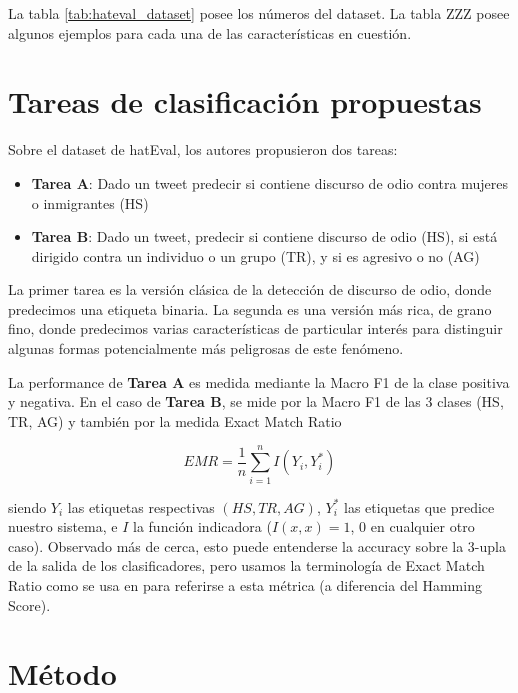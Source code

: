 La tabla \ref{tab:hateval_dataset} posee los números del dataset. La tabla ZZZ posee algunos ejemplos para cada una de las características en cuestión.

\section{Tareas de clasificación propuestas}

Sobre el dataset de hatEval, los autores propusieron dos tareas:

\newcommand{\subtaska}[0]{\textbf{Tarea A}}
\newcommand{\subtaskb}[0]{\textbf{Tarea B}}

\begin{itemize}
    \item \subtaska{}: Dado un tweet predecir si contiene discurso de odio contra mujeres o inmigrantes (HS)
    \item \subtaskb{}: Dado un tweet, predecir si contiene discurso de odio (HS), si está dirigido contra un individuo o un grupo (TR), y si es agresivo o no (AG)
\end{itemize}


La primer tarea es la versión clásica de la detección de discurso de odio, donde predecimos una etiqueta binaria. La segunda es una versión más rica, de grano fino, donde predecimos varias características de particular interés para distinguir algunas formas potencialmente más peligrosas de este fenómeno.

La performance de \subtaska{} es medida mediante la Macro F1 de la clase positiva y negativa. En el caso de \subtaskb{}, se mide por la Macro F1 de las 3 clases (HS, TR, AG) y también por la medida Exact Match Ratio

\begin{equation*}
    EMR = \frac{1}{n} \sum\limits_{i=1}^{n} I(Y_i, Y_i^*)
\end{equation*}

siendo $Y_i$ las etiquetas respectivas $(HS, TR, AG)$, $Y_i^*$ las etiquetas que predice nuestro sistema, e  $I$ la función indicadora ($I(x, x) = 1$, $0$ en cualquier otro caso). Observado más de cerca, esto puede entenderse la accuracy sobre la 3-upla de la salida de los clasificadores, pero usamos la terminología de Exact Match Ratio como se usa en \citet{zhang-2014-multilabel} para referirse a esta métrica (a diferencia del Hamming Score).

\section{Método}

